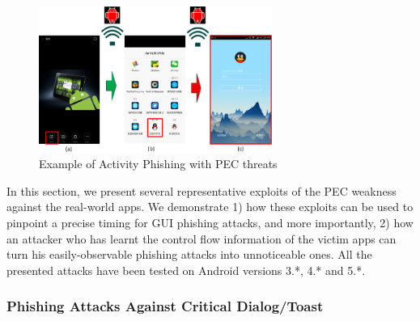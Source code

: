 \begin{figure}
\centering
\includegraphics[width = 3.0in]{pic5.png}
\caption{\label{}Example of Activity Phishing with PEC threats}
\end{figure}


In this section, we present several representative exploits of the PEC weakness against the real-world apps. 
We demonstrate 1) how these exploits can be used to 
pinpoint a precise timing for GUI phishing attacks, and more importantly, 
2) how an attacker who has learnt the control flow information of the victim apps 
 can turn his easily-observable phishing attacks into unnoticeable ones. 
All the presented attacks have been tested on Android versions 3.*, 4.* and 5.*. 




\subsubsection{Phishing Attacks Against Critical Dialog/Toast}


